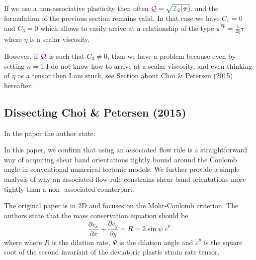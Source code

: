 
\begin{remark}
If we use a non-associative plasticity then often $\QQQ=\sqrt{{\III}_2(\bm\tau)}$.
and the formulation of the previous section remains valid. In that case 
we have $C_1=0$ and $C_3=0$ which allows to easily arrive at a relationship 
of the type $\dot{\bm\varepsilon}^{vp} = \frac{1}{2\eta} \bm\tau$ where 
$\eta$ is a scalar viscosity. 

However, if ${\color{violet}\cal Q}$ is such that $C_3\neq 0$, then we have a problem because 
even by setting $n=1$ I do not know how to arrive at a scalar viscosity, 
and even thinking of $\eta$ as a tensor then I am stuck, see Section about 
Choi \& Petersen (2015) hereafter.
\end{remark}


\newpage
\subsection{Dissecting Choi \& Petersen (2015)}

In the paper the author state:
\begin{displayquote}
{\color{darkgray}
In this paper, we conﬁrm that using an associated ﬂow rule is a
straightforward way of acquiring shear band orientations tightly
bound around the Coulomb angle in conventional numerical tectonic
models. We further provide a simple analysis of why an associated
ﬂow rule constrains shear band orientations more tightly than a non-
associated counterpart.}
\end{displayquote}


The original paper \cite{chpe15} is in 2D and focuses on the Mohr-Coulomb criterion. 
The authors state that the mass conservation equation should be 
\[
\frac{\partial v_x}{\partial x}
+
\frac{\partial v_y}{\partial y}
=
R=2 \sin \psi \; \dot{\varepsilon}^p
\]
where where $R$ is the dilation rate, $\Psi$ is the dilation angle and
$\dot{\varepsilon}^p$ is the square root of the second invariant of the deviatoric plastic strain rate tensor.


